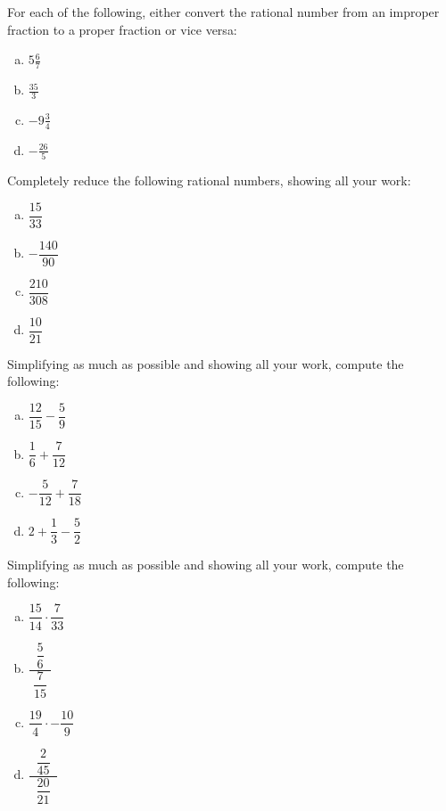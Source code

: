 \documentclass[11pt,letterpaper]{article}
\begin{document}
\newpage



 For each of the following, either convert the rational number from an improper fraction to a proper fraction or vice versa:
	\begin{enumerate}[(a)]
	\item $5\frac{6}{7}$
	\item $\frac{35}{3}$
	\item $-9\frac{3}{4}$
	\item $-\frac{26}{5}$
	\end{enumerate}	



\newpage



 Completely reduce the following rational numbers, showing all your work:
	\begin{enumerate}[(a)]
	\item $\dfrac{15}{33}$
	\item $-\dfrac{140}{90}$
	\item $\dfrac{210}{308}$
	\item $\dfrac{10}{21}$
	\end{enumerate}



\newpage



 Simplifying as much as possible and showing all your work, compute the following:
	\begin{enumerate}[(a)]
	\item $\dfrac{12}{15} - \dfrac{5}{9}$
	\item $\dfrac{1}{6} + \dfrac{7}{12}$
	\item $-\dfrac{5}{12} + \dfrac{7}{18}$
	\item $2 + \dfrac{1}{3} - \dfrac{5}{2}$
	\end{enumerate}



\newpage



 Simplifying as much as possible and showing all your work, compute the following:
	\begin{enumerate}[(a)]
	\item $\dfrac{15}{14} \cdot \dfrac{7}{33}$
	\item $\dfrac{\;\;\dfrac{5}{6}\;\;}{\dfrac{7}{15}}$
	\item $\dfrac{19}{4} \cdot -\dfrac{10}{9}$
	\item $\dfrac{\;\;\dfrac{2}{45}\;\;}{\dfrac{20}{21}}$
	\end{enumerate}
\end{document}
